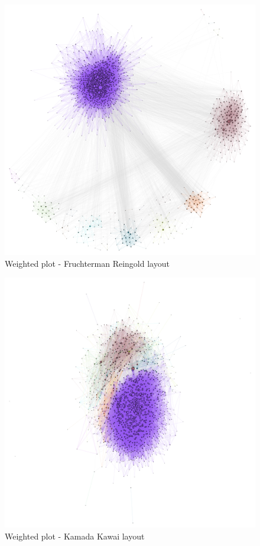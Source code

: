 \documentclass[12pt, a4paper]{article}
\begin{document}

\begin{figure}
    \centering
    \includegraphics[width=\textwidth]{src/youtube/hdg_weighted/hdg_pg_fg}
    \caption{Weighted plot - Fruchterman Reingold layout}
    \label{fig:hdg_pg_fg}
\end{figure}

\begin{figure}
    \centering
    \includegraphics[width=\textwidth]{src/youtube/hdg_weighted/hdg_pg_kawai}
    \caption{Weighted plot - Kamada Kawai layout}
    \label{fig:hdg_pg_kawai}
\end{figure}
\end{document}

